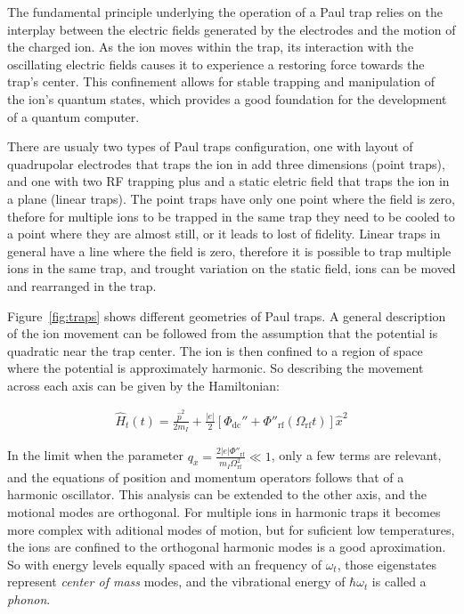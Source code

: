 \documentclass[
  journal=largetwo,
  year=2023,
]{cup-journal}
\begin{document}
The fundamental principle underlying the operation of a Paul trap relies on the interplay between the electric fields generated by the electrodes and the motion of the charged ion. As the ion moves within the trap, its interaction with the oscillating electric fields causes it to experience a restoring force towards the trap's center. This confinement allows for stable trapping and manipulation of the ion's quantum states, which provides a good foundation for the development of a quantum computer.

There are usualy two types of Paul traps configuration, one with layout of quadrupolar electrodes that traps the ion in add three dimensions (point traps), and one with two RF trapping plus and a static eletric field that traps the ion in a plane (linear traps).
The point traps have only one point where the field is zero, thefore for multiple ions to be trapped in the same trap they need to be cooled to a point where they are almost still, or it leads to lost of fidelity.
Linear traps in general have a line where the field is zero, therefore it is possible to trap multiple ions in the same trap, and trought variation on the static field, ions can be moved and rearranged in the trap.

Figure~\ref{fig:traps} shows different geometries of Paul traps. A general description of the ion movement \autocite{leibfried_2003_quantum} can be followed from the assumption that the potential is quadratic near the trap center. The ion is then confined to a region of space where the potential is approximately harmonic. So describing the movement across each axis can be given by the Hamiltonian:

\begin{equation}
  \begin{aligned}\label{eq:ionhamilt}
    \hat{H}_t(t) = \frac{\hat{p}^{2}}{2m_I} + \frac{|e|}{2}[\Phi_{\mathrm{dc}}'' + \Phi''_{\mathrm{rf}}(\Omega_{\mathrm{rf}}t)]\hat{x}^2
  \end{aligned}
\end{equation}

\noindent In the limit when the parameter \( q_x = \frac{2|e|\Phi''_{\mathrm{rf}}}{m_I \Omega^2_{\mathrm{rf} }} \ll 1\), only a few terms are relevant, and the equations of position and momentum operators follows that of a harmonic oscillator. This analysis can be extended to the other axis, and the motional modes are orthogonal. For multiple ions in harmonic traps it becomes more complex with aditional modes of motion, but for suficient low temperatures, the ions are confined to the orthogonal harmonic modes is a good aproximation.
So with energy levels equally spaced with an frequency of \(\omega_t\), those eigenstates represent {\it center of mass} modes, and the vibrational energy of \(\hbar\omega_t\) is called a {\it phonon}.
\end{document}

